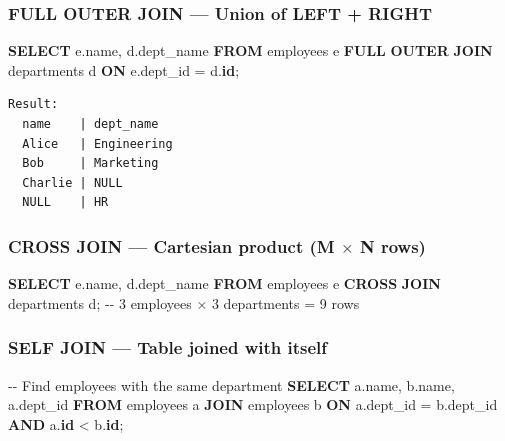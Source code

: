 \documentclass[11pt]{article}
\newenvironment{Shaded}{\begin{snugshade}}{\end{snugshade}}
\newcommand{\CommentTok}[1]{\textcolor[rgb]{0.48,0.49,0.49}{#1}}
\newcommand{\KeywordTok}[1]{\textcolor[rgb]{0.81,0.81,0.76}{\textbf{#1}}}
\newcommand{\NormalTok}[1]{\textcolor[rgb]{0.81,0.81,0.76}{#1}}
\newcommand{\OperatorTok}[1]{\textcolor[rgb]{0.81,0.81,0.76}{#1}}
\begin{document}
\subsubsection{FULL OUTER JOIN --- Union of LEFT + RIGHT}\label{full-outer-join--union-of-left--right}


\begin{Shaded}
\begin{Highlighting}[]
\KeywordTok{SELECT}\NormalTok{ e.name, d.dept\_name}
\KeywordTok{FROM}\NormalTok{ employees e}
\KeywordTok{FULL} \KeywordTok{OUTER} \KeywordTok{JOIN}\NormalTok{ departments d }\KeywordTok{ON}\NormalTok{ e.dept\_id }\OperatorTok{=}\NormalTok{ d.}\KeywordTok{id}\NormalTok{;}
\end{Highlighting}
\end{Shaded}

\setcodelang{}

\begin{verbatim}
Result:
  name    | dept_name
  Alice   | Engineering
  Bob     | Marketing
  Charlie | NULL
  NULL    | HR
\end{verbatim}

\subsubsection{\texorpdfstring{CROSS JOIN --- Cartesian product (M \(\times\) N rows)}{CROSS JOIN --- Cartesian product (M \textbackslash times N rows)}}\label{cross-join--cartesian-product-m-times-n-rows}


\begin{Shaded}
\begin{Highlighting}[]
\KeywordTok{SELECT}\NormalTok{ e.name, d.dept\_name}
\KeywordTok{FROM}\NormalTok{ employees e }\KeywordTok{CROSS} \KeywordTok{JOIN}\NormalTok{ departments d;}
\CommentTok{{-}{-} 3 employees × 3 departments = 9 rows}
\end{Highlighting}
\end{Shaded}

\subsubsection{SELF JOIN --- Table joined with itself}\label{self-join--table-joined-with-itself}


\begin{Shaded}
\begin{Highlighting}[]
\CommentTok{{-}{-} Find employees with the same department}
\KeywordTok{SELECT}\NormalTok{ a.name, b.name, a.dept\_id}
\KeywordTok{FROM}\NormalTok{ employees a}
\KeywordTok{JOIN}\NormalTok{ employees b }\KeywordTok{ON}\NormalTok{ a.dept\_id }\OperatorTok{=}\NormalTok{ b.dept\_id }\KeywordTok{AND}\NormalTok{ a.}\KeywordTok{id} \OperatorTok{\textless{}}\NormalTok{ b.}\KeywordTok{id}\NormalTok{;}
\end{Highlighting}
\end{Shaded}
\end{document}
